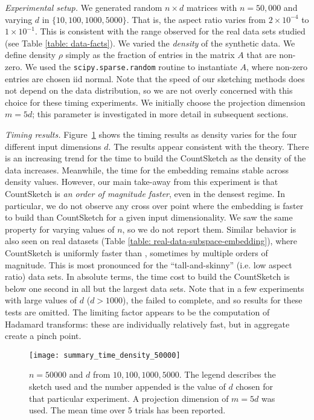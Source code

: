 \noindent
\textit{Experimental setup.}
We generated random $n \times d$ matrices with $n=50,000$ and varying $d$
in $\{ 10, 100, 1000, 5000 \}$.
That is, the aspect ratio varies from $2 \times 10^{-4}$ to $1\times
10^{-1}$.
This is consistent with the range observed for the real data sets studied (see
Table \ref{table: data-facts}).
We varied the \textit{density} of the synthetic data.
We define density $\rho$ simply as the fraction of entries in the matrix $A$
that are non-zero.
We used the \texttt{scipy.sparse.random} routine to instantiate $A$,
where non-zero entries are chosen iid normal.
Note that the speed of our sketching methods does not depend on the data
distribution, so we are not overly concerned with this choice for
these timing experiments.
We initially choose the projection dimension $m = 5d$; this parameter
is investigated in more detail in subsequent sections.

\noindent
\textit{Timing results.}
Figure~\ref{fig: summary-time-50000} shows the timing results as
density varies for the four different input dimensions $d$.
The results appear consistent with the theory.
There is an increasing
trend for the time to build the CountSketch as the density of the data
increases.
Meanwhile, the time for the \SRHT embedding remains stable across
density values.
%
However, our main take-away from this experiment is that CountSketch
is \textit{an order of magnitude faster}, even in the densest regime.
In particular, we do not observe any cross over point where the \SRHT
embedding is faster to build than CountSketch for a given input
dimensionality.
We saw the same property for varying values of $n$, so we do not
report them.
Similar behavior is also seen on real datasets (Table
\ref{table: real-data-subspace-embedding}), where CountSketch is
uniformly faster than \SRHT, sometimes by multiple orders of
magnitude.
This is most pronounced for the ``tall-and-skinny'' (i.e. low aspect
ratio) data sets.
In absolute terms, the time cost to build the CountSketch is below one
second in all but the largest data sets.
Note that in a few experiments with large values of $d$ ($d>1000$),
the \SRHT failed to complete, and so results for these tests are
omitted.
The limiting factor appears to be the computation of Hadamard
transforms: these are individually relatively fast, but in aggregate create a
pinch point.


\begin{figure}
  \centering
\texttt{[image: summary\_time\_density\_50000]}
        \caption{$n=50000$ and $d$ from $10,100,1000,5000$.  The legend
        describes the sketch used and the number appended is the value of $d$
        chosen for that particular experiment.
        A projection dimension of $m=5d$ was used.
        The mean time over 5 trials has been reported.}
        \label{fig: summary-time-50000}
\end{figure}





